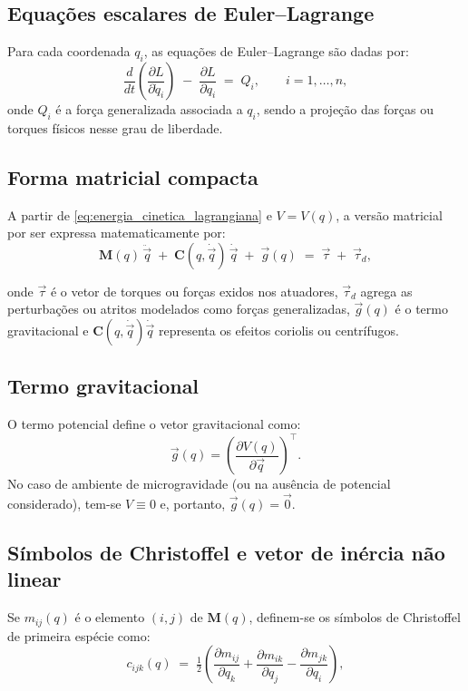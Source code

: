 \subsection{Equações escalares de Euler--Lagrange}
Para cada coordenada $q_i$, as equações de Euler--Lagrange são dadas por:
\begin{equation}
\frac{d}{dt}\!\left(\frac{\partial L}{\partial \dot q_i}\right) \;-\; \frac{\partial L}{\partial q_i}
\;=\; Q_i,
\qquad i=1,\dots,n,
\label{eq:EL_componentes}
\end{equation}
onde $Q_i$ é a força generalizada associada a $q_i$, sendo a projeção das forças ou torques físicos nesse grau de liberdade.

\subsection{Forma matricial compacta}
A partir de \eqref{eq:energia_cinetica_lagrangiana} e $V=V(q)$, a versão matricial por ser expressa matematicamente por:
\begin{equation}
\mathbf M(q)\,\ddot{\vec q} \;+\; \mathbf C(q,\dot{\vec q})\,\dot{\vec q} \;+\; \vec g(q)
\;=\; \vec \tau \;+\; \vec \tau_{\!d},
\label{eq:EL_compacta}
\end{equation}

onde $\vec\tau$ é o vetor de torques ou forças exidos nos atuadores,
$\vec \tau_{\!d}$ agrega as perturbações ou atritos modelados como forças generalizadas,
$\vec g(q)$ é o termo gravitacional e
$\mathbf C(q,\dot{\vec q})\dot{\vec q}$ representa os efeitos coriolis ou centrífugos.

\subsection{Termo gravitacional}
O termo potencial define o vetor gravitacional como:
\begin{equation}
\vec g(q)=
\left(\frac{\partial V(q)}{\partial \vec q}\right)^{\!\top}.
\label{eq:g_def}
\end{equation}
No caso de ambiente de microgravidade (ou na ausência de potencial considerado), tem-se $V\equiv 0$ e, portanto, $\vec g(q)=\vec 0$.

\subsection{Símbolos de Christoffel e vetor de inércia não linear}
Se $m_{ij}(q)$ é o elemento $(i,j)$ de $\mathbf M(q)$,
definem-se os símbolos de Christoffel de primeira espécie como:
\begin{equation}
c_{ijk}(q)\;=\;\tfrac12\!\left(\frac{\partial m_{ij}}{\partial q_k}
+\frac{\partial m_{ik}}{\partial q_j}
-\frac{\partial m_{jk}}{\partial q_i}\right),
\label{eq:christoffel}
\end{equation}

